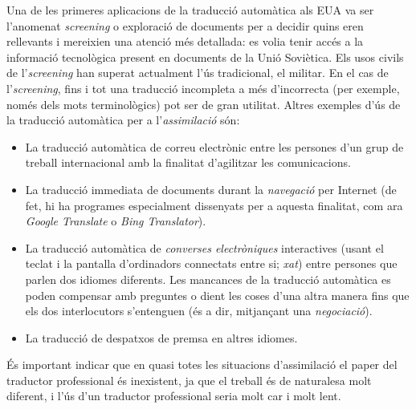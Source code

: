 Una de les primeres aplicacions de la traducció automàtica als EUA va
ser l'anomenat \emph{screening} o exploració de documents per a
decidir quins eren rellevants i mereixien una atenció més detallada:
es volia tenir accés a la informació tecnològica present en documents
de la Unió Soviètica. Els usos civils de l'\emph{screening} han
superat actualment l'ús tradicional, el militar. En el cas de
l'\emph{screening}, fins i tot una traducció incompleta a més
d'incorrecta (per exemple, només dels mots terminològics) pot ser de
gran utilitat.  Altres exemples d'ús de la traducció automàtica per a
l'\emph{assimilació} són:
\begin{itemize}
\item La traducció automàtica de correu electrònic entre les persones
  d'un grup de treball internacional amb la finalitat d'agilitzar les
  comunicacions.
\item La traducció immediata de documents durant la \emph{navegació}
  per Internet (de fet, hi ha programes especialment dissenyats per a
  aquesta finalitat, com ara \emph{Google Translate} o \emph{Bing
    Translator}).
\item La traducció automàtica de \emph{converses electròniques}
  interactives (usant el teclat i la pantalla d'ordinadors connectats
  entre si; \emph{xat}) entre persones que parlen dos idiomes
  diferents. Les mancances de la traducció automàtica es poden
  compensar amb preguntes o dient les coses d'una altra manera fins
  que els dos interlocutors s'entenguen (és a dir, mitjançant una
  \emph{negociació}).
\item La traducció de despatxos de premsa en altres idiomes.
\end{itemize}

És important indicar que en quasi totes les situacions d'assimilació
el paper del traductor professional és inexistent, ja que el treball
és de naturalesa molt diferent, i l'ús d'un traductor professional
seria molt car i molt lent.  

